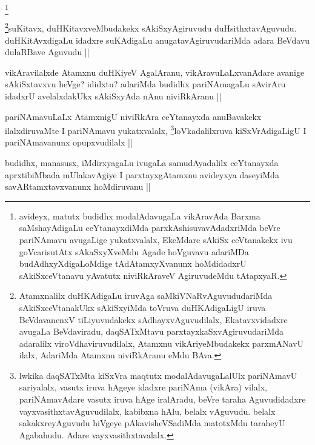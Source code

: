 \begin{artha}
\footnote{avideyx, matutx budidhx modalAdavugaLa vikAravAda Barxma saMshayAdigaLu ceYtanayxdiMda parxkAshisuvavAdadxriMda beVre pariNAmavu avugaLige yukatxvalalx, EkeMdare sAkiSx ceVtanakekx ivu goVcarisutAtx sAkaSxyXveMdu Agade hoVguvavu adariMDa budAdhxyXdigaLoMdige tAdAtamxyXvanunx hoMdidadxrU sAkiSxceVtanavu yAvatutx niviRkAraveV AgiruvudeMdu tAtapxyaR.}
\end{artha}

\begin{artha}
\footnote{Atamxnalilx duHKAdigaLu iruvAga saMkiVNaRvAguvududariMda sAkiSxceVtanakUkx sAkiSxyiMda toVruva duHKAdigaLigU iruva BeVdavanenxV tiLiyuvudakekx sAdhayxvAguvudilalx, Ekatavxvidadxre avugaLa BeVdaviradu, daqSATxMtavu parxtayxkaSxvAgiruvudariMda adaralilx viroVdhaviruvudilalx, Atamxnu vikAriyeMbudakekx parxmANavU ilalx, AdariMda Atamxnu niviRkAranu eMdu BAva.}suKitavx, duHKitavxveMbudakekx sAkiSxyAgiruvudu duHsithxtavAguvudu. duHKitAvxdigaLu idadxre suKAdigaLu anugatavAgiruvudariMda adara BeVdavu dulaRBave Aguvudu ||
\end{artha}

\begin{artha}
vikAravilalxde Atamxnu duHKiyeV AgalAranu, vikAravuLaLxvanAdare avanige sAkiSxtavxvu heVge? ididxtu? adariMda budidhx pariNAmagaLu sAvirAru idadxrU avelalxdakUkx sAkiSxyAda nAnu niviRkAranu ||
\end{artha}

\begin{artha}
pariNAmavuLaLx AtamxnigU niviRkAra ceYtanayxda anuBavakekx ilalxdiruvaMte I pariNAmavu yukatxvalalx, \footnote{lwkika daqSATxMta kiSxVra maqtutx modalAdavugaLalUlx pariNAmavU sariyalalx, vasutx iruva hAgeye idadxre pariNAma (vikAra) vilalx, pariNAmavAdare vasutx iruva hAge iralAradu, beVre taraha Aguvudidadxre vayxvasithxtavAguvudilalx, kabibxna hAlu, belalx vAguvudu. belalx sakakxreyAguvudu hiVgeye pAkavisheVSadiMda matotxMdu taraheyU Agabahudu. Adare vayxvasithxtavalalx.}loVkadalilxruva kiSxVrAdigaLigU I pariNAmavanunx opupxvudilalx ||
\end{artha}

\begin{artha}
budidhx, manasusx, iMdirxyagaLu ivugaLa samudAyadalilx ceYtanayxda aprxtibiMbada mUlakavAgiye I parxtayxgAtamxnu avideyxya daseyiMda savARtamxtavxvanunx hoMdiruvanu ||
\end{artha}


